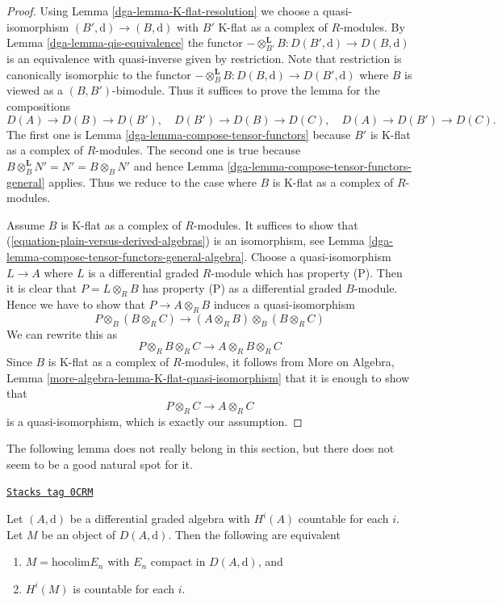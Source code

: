 \begin{proof}

Using Lemma \ref{dga-lemma-K-flat-resolution}
we choose a quasi-isomorphism $(B', \text{d}) \to (B, \text{d})$
with $B'$ K-flat as a complex of $R$-modules.
By Lemma \ref{dga-lemma-qis-equivalence}
the functor $-\otimes^\mathbf{L}_{B'} B : D(B', \text{d}) \to D(B, \text{d})$
is an equivalence with quasi-inverse given by restriction.
Note that restriction is canonically isomorphic to the functor
$- \otimes^\mathbf{L}_B B : D(B, \text{d}) \to D(B', \text{d})$
where $B$ is viewed as a $(B, B')$-bimodule.
Thus it suffices to prove the lemma for the compositions
$$
D(A) \to D(B) \to D(B'),\quad
D(B') \to D(B) \to D(C),\quad
D(A) \to D(B') \to D(C).
$$
The first one is Lemma \ref{dga-lemma-compose-tensor-functors}
because $B'$ is K-flat as a complex of $R$-modules.
The second one is true because
$B \otimes_B^\mathbf{L} N' = N' = B \otimes_B N'$
and hence Lemma \ref{dga-lemma-compose-tensor-functors-general} applies.
Thus we reduce to the case where $B$ is K-flat as a complex
of $R$-modules.

\medskip\noindent
Assume $B$ is K-flat as a complex of $R$-modules. It suffices to
show that (\ref{equation-plain-versus-derived-algebras}) is an
isomorphism, see
Lemma \ref{dga-lemma-compose-tensor-functors-general-algebra}.
Choose a quasi-isomorphism $L \to A$ where $L$ is a differential
graded $R$-module which has property (P). Then it is clear that
$P = L \otimes_R B$ has property (P) as a differential graded $B$-module.
Hence we have to show that $P \to A \otimes_R B$
induces a quasi-isomorphism
$$
P \otimes_B (B \otimes_R C)
\longrightarrow
(A \otimes_R B) \otimes_B (B \otimes_R C)
$$
We can rewrite this as
$$
P \otimes_R B \otimes_R C \longrightarrow A \otimes_R B \otimes_R C
$$
Since $B$ is K-flat as a complex of $R$-modules, it
follows from
More on Algebra, Lemma \ref{more-algebra-lemma-K-flat-quasi-isomorphism}
that it is enough
to show that
$$
P \otimes_R C \to A \otimes_R C
$$
is a quasi-isomorphism, which is exactly our assumption.
\end{proof}

The following lemma does not really belong in this section, but there
does not seem to be a good natural spot for it.

\begin{lemma}[Countable]
\label{dga-lemma-countable}
\href{https://stacks.math.columbia.edu/tag/0CRM}{\texttt{Stacks tag 0CRM}}

Let $(A, \text{d})$ be a differential graded algebra with
$H^i(A)$ countable for each $i$. Let $M$ be an object of $D(A, \text{d})$.
Then the following are equivalent
\begin{enumerate}
\item $M = \text{hocolim} E_n$ with $E_n$ compact in $D(A, \text{d})$, and
\item $H^i(M)$ is countable for each $i$.
\end{enumerate}
\end{lemma}

